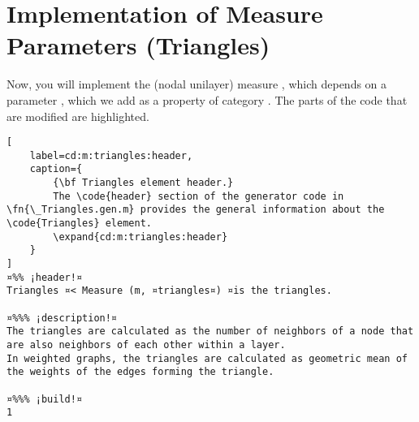 \documentclass{tufte-handout}
\begin{document}
\clearpage
\section{Implementation of Measure Parameters (Triangles)}

Now, you will implement the (nodal unilayer) measure , which depends on a parameter , which we add as a property of category .
{%
The parts of the code that are modified are highlighted.
}%

\begin{lstlisting}[
	label=cd:m:triangles:header,
	caption={
		{\bf Triangles element header.}
		The \code{header} section of the generator code in \fn{\_Triangles.gen.m} provides the general information about the \code{Triangles} element.
		\expand{cd:m:triangles:header}
	}
]
¤%% ¡header!¤
Triangles ¤< Measure (m, ¤triangles¤) ¤is the triangles.

¤%%% ¡description!¤
The triangles are calculated as the number of neighbors of a node that are also neighbors of each other within a layer. 
In weighted graphs, the triangles are calculated as geometric mean of the weights of the edges forming the triangle.

¤%%% ¡build!¤
1
\end{lstlisting}
\end{document}

